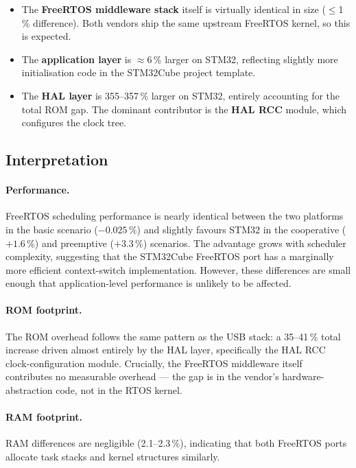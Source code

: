 \begin{itemize}
  \item The \textbf{FreeRTOS middleware stack} itself is virtually identical in size
    ($\leq$1\,\% difference). Both vendors ship the same upstream FreeRTOS kernel, so
    this is expected.
  \item The \textbf{application layer} is $\approx$6\,\% larger on STM32, reflecting
    slightly more initialisation code in the STM32Cube project template.
  \item The \textbf{HAL layer} is 355--357\,\% larger on STM32, entirely accounting for
    the total ROM gap. The dominant contributor is the \textbf{HAL RCC} module, which
    configures the clock tree.
\end{itemize}

\subsection{Interpretation}
\label{sec:gd32-freertos-interp}

\paragraph{Performance.}
FreeRTOS scheduling performance is nearly identical between the two platforms in the basic
scenario ($-0.025\,\%$) and slightly favours STM32 in the cooperative ($+1.6\,\%$) and
preemptive ($+3.3\,\%$) scenarios. The advantage grows with scheduler complexity, suggesting
that the STM32Cube FreeRTOS port has a marginally more efficient context-switch
implementation. However, these differences are small enough that application-level
performance is unlikely to be affected.

\paragraph{ROM footprint.}
The ROM overhead follows the same pattern as the USB stack: a 35--41\,\% total increase
driven almost entirely by the HAL layer, specifically the HAL RCC clock-configuration
module. Crucially, the FreeRTOS middleware itself contributes no measurable overhead ---
the gap is in the vendor's hardware-abstraction code, not in the RTOS kernel.

\paragraph{RAM footprint.}
RAM differences are negligible (2.1--2.3\,\%), indicating that both FreeRTOS ports allocate
task stacks and kernel structures similarly.

